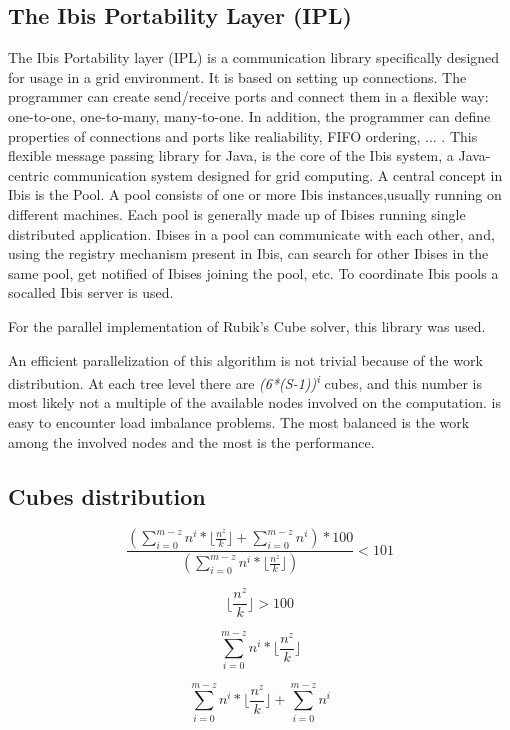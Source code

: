 \documentclass[a4paper]{article}
\begin{document}
\subsection{The Ibis Portability Layer (IPL)}
\label{sec:ibis}
The Ibis Portability layer (IPL) is a communication library specifically designed for usage in a grid environment. It is based on setting up connections. The programmer can create send/receive ports and connect them in a flexible way: one-to-one, one-to-many, many-to-one. In addition, the programmer can define properties of connections and ports like realiability, FIFO ordering, ... . This flexible message passing library for Java, is the core of the Ibis system, a Java-centric communication system designed for grid computing. A central concept in Ibis is the Pool. A pool consists of one or more Ibis instances,usually running on different machines. Each pool is generally made up of Ibises running single distributed application. Ibises in a pool can communicate with each other,
and, using the registry mechanism present in Ibis, can search for other Ibises in the
same pool, get notified of Ibises joining the pool, etc. To coordinate Ibis pools a socalled Ibis server is used.

For the parallel implementation of Rubik's Cube solver, this library was used.



An efficient parallelization of this algorithm is not trivial because of the work distribution. At each tree level there are \textit{(6*(S-1))\textsuperscript{i}} cubes, and this number is most likely not a multiple of the available nodes involved on the computation.
is easy to encounter load imbalance problems. The most balanced is the work among the involved nodes and the most is the performance.

\subsection{Cubes distribution}
\label{sec:cubes_distr}


\begin{equation} 
\label{eq:eq1}
\frac{(\sum_{i=0}^{m-z}{n^i}*\lfloor\frac{n^z}{k}\rfloor +  \sum_{i=0}^{m-z}{n^i})*100}{(\sum_{i=0}^{m-z}{n^i}*\lfloor\frac{n^z}{k}\rfloor)} < 101
\end{equation}

\begin{equation} 
\label{eq:eq1}
\lfloor\frac{n^z}{k}\rfloor > 100
\end{equation}

\begin{equation} 
\label{eq:eq1}
\sum_{i=0}^{m-z}{n^i}*\lfloor\frac{n^z}{k}\rfloor
\end{equation}

\begin{equation} 
\label{eq:eq1}
\sum_{i=0}^{m-z}{n^i}*\lfloor\frac{n^z}{k}\rfloor +  \sum_{i=0}^{m-z}{n^i}
\end{equation}

\printbibliography 
\end{document}
